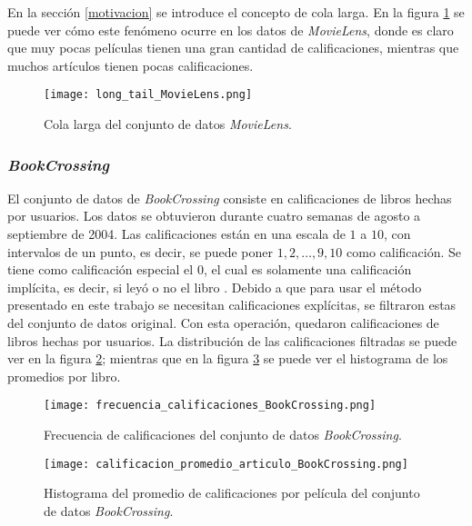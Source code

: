 En la sección \ref{motivacion} se introduce el concepto de cola larga. En la figura \ref{fig:ML_long_tail} se puede ver cómo este fenómeno ocurre en los datos de \textit{MovieLens}, donde es claro que muy pocas películas tienen una gran cantidad de calificaciones, mientras que muchos artículos tienen pocas calificaciones.

\begin{figure}
	\centering
 	\texttt{[image: long\_tail\_MovieLens.png]}
 	\caption{Cola larga del conjunto de datos \textit{MovieLens}.}
 	\label{fig:ML_long_tail}
\end{figure}








\subsubsection{\textit{BookCrossing}}

El conjunto de datos de \textit{BookCrossing} consiste en  calificaciones de  libros hechas por  usuarios. Los datos se obtuvieron durante cuatro semanas de agosto a septiembre de 2004. Las calificaciones están en una escala de $1$ a $10$, con intervalos de un punto, es decir, se puede poner $1, 2, \hdots, 9, 10$ como calificación. Se tiene como calificación especial el $0$, el cual es solamente una calificación implícita, es decir, si leyó o no el libro \cite{ziegler2005improving}. Debido a que para usar el método presentado en este trabajo se necesitan calificaciones explícitas, se filtraron estas del conjunto de datos original. Con esta operación, quedaron  calificaciones de  libros hechas por  usuarios. La distribución de las calificaciones filtradas se puede ver en la figura \ref{fig:BC_frec_calificaciones}; mientras que en la figura \ref{fig:BC_hist_prom_cals} se puede ver el histograma de los promedios por libro.

\begin{figure}
	\centering
 	\texttt{[image: frecuencia\_calificaciones\_BookCrossing.png]}
 	\caption{Frecuencia de calificaciones del conjunto de datos \textit{BookCrossing}.}
 	\label{fig:BC_frec_calificaciones}
\end{figure}

\begin{figure}
	\centering
 	\texttt{[image: calificacion\_promedio\_articulo\_BookCrossing.png]}
 	\caption{Histograma del promedio de calificaciones por película del conjunto de datos \textit{BookCrossing}.}
 	\label{fig:BC_hist_prom_cals}
\end{figure}

